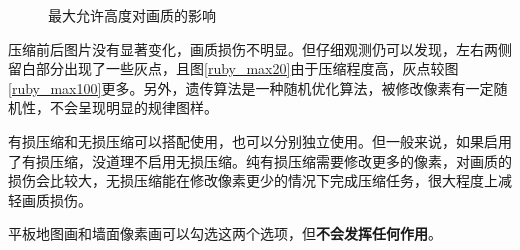 \documentclass[UTF8]{ctexart}
\begin{document}
\begin{figure}[htbp]
    \centering
    \caption{最大允许高度对画质的影响}
\end{figure}

压缩前后图片没有显著变化，画质损伤不明显。但仔细观测仍可以发现，左右两侧留白部分出现了一些灰点，且图\ref*{ruby_max20}由于压缩程度高，灰点较图\ref*{ruby_max100}更多。另外，遗传算法是一种随机优化算法，被修改像素有一定随机性，不会呈现明显的规律图样。

有损压缩和无损压缩可以搭配使用，也可以分别独立使用。但一般来说，如果启用了有损压缩，没道理不启用无损压缩。纯有损压缩需要修改更多的像素，对画质的损伤会比较大，无损压缩能在修改像素更少的情况下完成压缩任务，很大程度上减轻画质损伤。

平板地图画和墙面像素画可以勾选这两个选项，但\textbf{不会发挥任何作用}。
\end{document}
